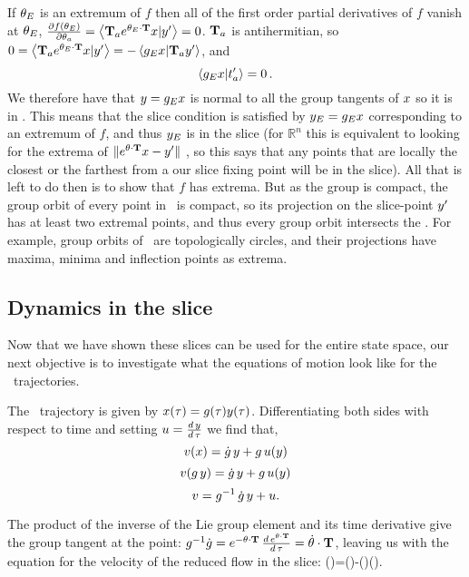 {If ${\bf \theta}_E$ is an extremum of $f$ then all of the first order partial derivatives of $f$ vanish at ${\bf \theta}_E$, $\frac{\partial f({\bf \theta}_E)}{\partial {\bf \theta}_a} =\left\langle {\ensuremath{\mathbf{T}}_a e^{\ensuremath{{\bf \theta}}_E \cdot \ensuremath{\mathbf{T}}} \ensuremath{x}}|{{y'}} \right\rangle=0$. $\mathbf{T}_a$ is antihermitian, so
$0=\left\langle {\ensuremath{\mathbf{T}}_a e^{\ensuremath{{\bf \theta}}_E \cdot \ensuremath{\mathbf{T}}}\ensuremath{x}}|{{y'}} \right\rangle
= - \left\langle {\ensuremath{g}_E \ensuremath{x}}|{\mathbf{T}_a  {y'}} \right\rangle$,
and
\[
\left\langle {\ensuremath{g}_E \ensuremath{x}}|{t'_{a}} \right\rangle =0
\,.
\]
We therefore have that $y= g_E x$ is normal to all the group tangents of $x$ so it is in \pSRed. This means that the slice condition is satisfied by $y_E = g_E x$ corresponding to an extremum of $f$, and thus $y_E$ is in the slice (for $\mathbb{R}^n$ this is equivalent to looking for the extrema of $\|e^{{\bf \theta} \cdot \mathbf{T}}x - {y'}\|$ , so this says that any points that are locally the closest or the farthest from a our slice fixing point will be in the slice). All that is left to do then is to show that $f$ has extrema. But as the group is compact, the group orbit of every point in \pS\ is compact, so its projection on the slice-point ${y'}$ has at least two extremal points, and thus every group orbit intersects the \slice. For example, group orbits of \ are topologically circles, and their projections have maxima, minima and inflection points as extrema.


\subsection{Dynamics in the slice}
\label{sect:MovFrameODE}

Now that we have shown these slices can be used for the entire state space, our next objective is to investigate
what the equations of motion look like for the \reducedsp\ trajectories.

The \reducedsp\ trajectory is given by $x(\tau)=g(\tau) y(\tau)$. Differentiating both sides with respect to time and setting $u=\frac{d \, y}{d \, \tau}$ we find that,
\[
v(x)=\dot{g} \, y+g \, u(y) \]
\[
v(g \, y)=\dot{g} \, y+g \, u(y) \]
\[
v=g^{-1} \, \dot{g} \, y+ u. \]

The product of the inverse of the Lie group element and its time derivative give the group tangent at the point: $g^{-1}\dot{g}=e^{-{\bf \theta} \cdot \mathbf{T}} \,
\frac{d \, e^{{\bf \theta} \cdot \mathbf{T}}}{d \, \tau}=\dot{{\bf \theta}}\cdot \mathbf{T}$, leaving us with the equation for the velocity of the reduced flow in the slice:
\beq
\velRed(\sspRed)=\velRed(\sspRed)-\gSpace(\sspRed)\cdot \groupTan(\sspRed).

}
